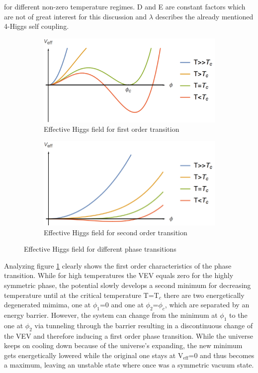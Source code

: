for different non-zero temperature regimes. D and E are constant factors which are not of great interest for this discussion and $\lambda$ describes the already mentioned 4-Higgs self coupling.
\begin{figure}[H]
	\centering
	\begin{subfigure}{0.49\textwidth}
		\includegraphics[width=\linewidth]{Images/Higgs1}
		\caption{Effective Higgs field for first order transition}
		\label{fig:higgs1}	
	\end{subfigure}
	\begin{subfigure}{0.49\textwidth}
		\includegraphics[width=\linewidth]{Images/Higgs2}
		\caption{Effective Higgs field for second order transition}
		\label{fig:higgs2}
	\end{subfigure}
	\caption{Effective Higgs field for different phase transitions}
	\label{fig:higgs}
\end{figure}
\noindent
Analyzing figure \ref{fig:higgs1} clearly shows the first order characteristics of the phase transition. While for high temperatures the VEV equals zero for the highly symmetric phase, the potential slowly develops a second minimum for decreasing temperature until at the critical temperature T=T$_c$ there are two energetically degenerated mimima, one at $\phi_1$=0 and one at $\phi_2$=$\phi_c$, which are separated by an energy barrier. However, the system can change from the minimum at $\phi_1$ to the one at $\phi_2$ via tunneling through the barrier resulting in a discontinuous change of the VEV and therefore inducing a first order phase transition. While the universe keeps on cooling down because of the universe's expanding, the new minimum gets energetically lowered while the original one stays at V$_\text{eff}$=0 and thus becomes a maximum, leaving an unstable state where once was a symmetric vacuum state. \newline
